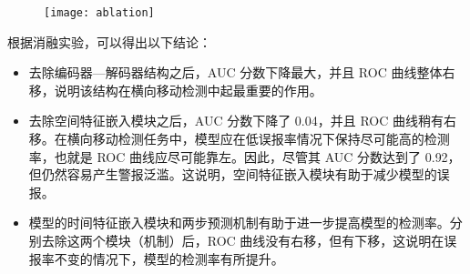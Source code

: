{\begin{figure}[t]
    \centering
    \texttt{[image: ablation]}
    \label{fig:experiment-ablation}

\end{figure}

根据消融实验，可以得出以下结论：

\begin{itemize}
    \item 去除编码器—解码器结构之后，AUC 分数下降最大，并且 ROC 曲线整体右移，说明该结构在横向移动检测中起最重要的作用。
    \item 去除空间特征嵌入模块之后，AUC 分数下降了 0.04，并且 ROC 曲线稍有右移。在横向移动检测任务中，模型应在低误报率情况下保持尽可能高的检测率，也就是 ROC 曲线应尽可能靠左。因此，尽管其 AUC 分数达到了 0.92，但仍然容易产生警报泛滥。这说明，空间特征嵌入模块有助于减少模型的误报。
    \item 模型的时间特征嵌入模块和两步预测机制有助于进一步提高模型的检测率。分别去除这两个模块（机制）后，ROC 曲线没有右移，但有下移，这说明在误报率不变的情况下，模型的检测率有所提升。
\end{itemize}




}
